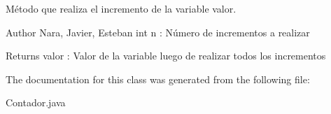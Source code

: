 Método que realiza el incremento de la variable valor. 

\begin{DoxyAuthor}{Author}
Nara, Javier, Esteban  int n \+: Número de incrementos a realizar 
\end{DoxyAuthor}
\begin{DoxyReturn}{Returns}
valor \+: Valor de la variable luego de realizar todos los incrementos 
\end{DoxyReturn}


The documentation for this class was generated from the following file\+:\begin{DoxyCompactItemize}
\item 
Contador.\+java\end{DoxyCompactItemize}
